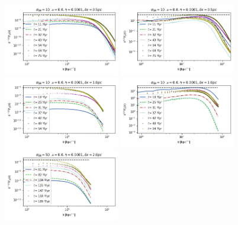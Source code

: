 \documentclass[iop,apj,numberedappendix,twocolappendix]{emulateapj}
\begin{document}
\begin{figure}
\centering
\includegraphics[trim=0.0cm 0.00cm 0.0cm 0.0cm,clip=true,width=0.45\textwidth]{csc_figs/05pcPm0e-4_0Bpower.png}
\includegraphics[trim=0.0cm 0.00cm 0.0cm 0.0cm,clip=true,width=0.45\textwidth]{csc_figs/05pcPm0e-4_0kpower.png}
\includegraphics[trim=0.0cm 0.00cm 0.0cm 0.0cm,clip=true,width=0.45\textwidth]{csc_figs/1pcPm0e-4_0Bpower.png}
\includegraphics[trim=0.0cm 0.00cm 0.0cm 0.0cm,clip=true,width=0.45\textwidth]{csc_figs/1pcPm0e-4_0kpower.png}
\includegraphics[trim=0.0cm 0.00cm 0.0cm 0.0cm,clip=true,width=0.45\textwidth]{csc_figs/2pcPm0e-4_0Bpower.png}

\end{figure}
\end{document}
